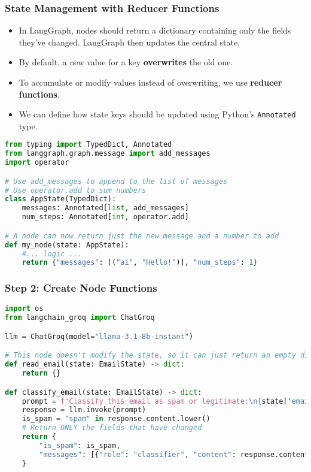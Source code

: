 	  
\begin{frame}[fragile]\frametitle{State Management with Reducer Functions}
      \begin{itemize}
        \item In LangGraph, nodes should return a dictionary containing only the fields they've changed. LangGraph then updates the central state.
        \item By default, a new value for a key \textbf{overwrites} the old one.
        \item To accumulate or modify values instead of overwriting, we use \textbf{reducer functions}.
        \item We can define how state keys should be updated using Python's \texttt{Annotated} type.
      \end{itemize}
\begin{lstlisting}[language=Python, basicstyle=\tiny]
from typing import TypedDict, Annotated
from langgraph.graph.message import add_messages
import operator

# Use add_messages to append to the list of messages
# Use operator.add to sum numbers
class AppState(TypedDict):
    messages: Annotated[list, add_messages]
    num_steps: Annotated[int, operator.add]

# A node can now return just the new message and a number to add
def my_node(state: AppState):
    #... logic ...
    return {"messages": [("ai", "Hello!")], "num_steps": 1}
\end{lstlisting}
\end{frame}

\begin{frame}[fragile]\frametitle{Step 2: Create Node Functions}
      \begin{lstlisting}[language=Python, basicstyle=\tiny]
import os
from langchain_groq import ChatGroq

llm = ChatGroq(model="llama-3.1-8b-instant") 

# This node doesn't modify the state, so it can just return an empty dictionary
def read_email(state: EmailState) -> dict:
    return {}

def classify_email(state: EmailState) -> dict:
    prompt = f"Classify this email as spam or legitimate:\n{state['email_content']}\nRespond with only 'spam' or 'legitimate'."
    response = llm.invoke(prompt)
    is_spam = "spam" in response.content.lower()
    # Return ONLY the fields that have changed
    return {
        "is_spam": is_spam,
        "messages": [{"role": "classifier", "content": response.content}]
    }
      \end{lstlisting}
\end{frame}

